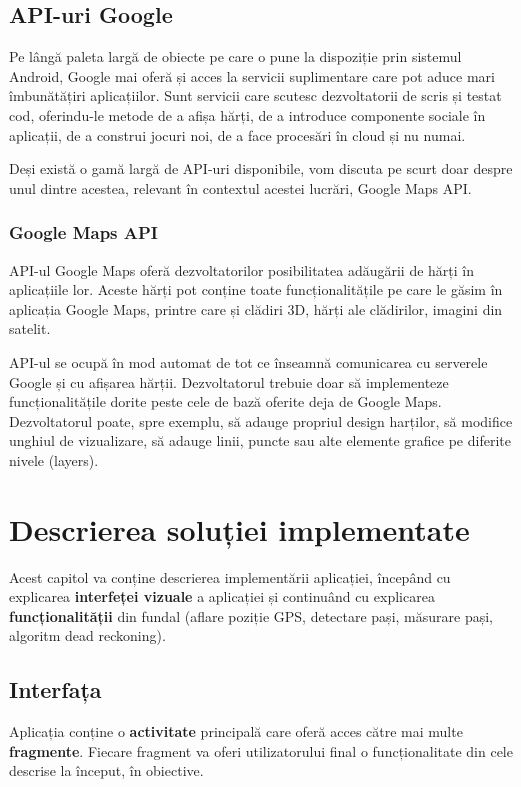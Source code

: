 \documentclass[12pt, a4paper, oneside]{article}
\begin{document}
\newpage
\subsection{API-uri Google}
Pe lângă paleta largă de obiecte pe care o pune la dispoziție prin sistemul Android, Google mai oferă și acces la servicii suplimentare care pot aduce mari îmbunătățiri aplicațiilor. Sunt servicii care scutesc dezvoltatorii de scris și testat cod, oferindu-le metode de a afișa hărți, de a introduce componente sociale în aplicații, de a construi jocuri noi, de a face procesări în cloud și nu numai.

Deși există o gamă largă de API-uri disponibile, vom discuta pe scurt doar despre unul dintre acestea, relevant în contextul acestei lucrări, Google Maps API.

\subsubsection{Google Maps API \cite{GoogleMapsAndroidAPI}}
API-ul Google Maps oferă dezvoltatorilor posibilitatea adăugării de hărți în aplicațiile lor. Aceste hărți pot conține toate funcționalitățile pe care le găsim în aplicația Google Maps, printre care și clădiri 3D, hărți ale clădirilor, imagini din satelit.

API-ul se ocupă în mod automat de tot ce înseamnă comunicarea cu serverele Google și cu afișarea hărții. Dezvoltatorul trebuie doar să implementeze funcționalitățile dorite peste cele de bază oferite deja de Google Maps. Dezvoltatorul poate, spre exemplu, să adauge propriul design harților, să modifice unghiul de vizualizare, să adauge linii, puncte sau alte elemente grafice pe diferite nivele (layers).

\newpage




\newpage
\section{Descrierea soluției implementate} \label{DescriereAplicatie}
Acest capitol va conține descrierea implementării aplicației, începând cu explicarea \textbf{interfeței vizuale} a aplicației și continuând cu explicarea \textbf{funcționalității} din fundal (aflare poziție GPS, detectare pași, măsurare pași, algoritm dead reckoning).

\subsection{Interfața} \label{DescriereInterfata}
Aplicația conține o \textbf{activitate} principală care oferă acces către mai multe \textbf{fragmente}. Fiecare fragment va oferi utilizatorului final o funcționalitate din cele descrise la început, în obiective.
\end{document}
